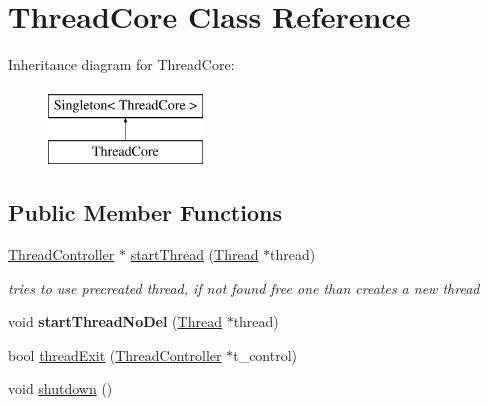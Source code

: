 \hypertarget{classThreadCore}{\section{\-Thread\-Core \-Class \-Reference}
\label{classThreadCore}
}
\-Inheritance diagram for \-Thread\-Core\-:\begin{figure}[H]
\begin{center}
\leavevmode
\includegraphics[height=2.000000cm]{classThreadCore}
\end{center}
\end{figure}
\subsection*{\-Public \-Member \-Functions}
\begin{DoxyCompactItemize}
\item 
\hyperlink{classThreadController}{\-Thread\-Controller} $\ast$ \hyperlink{classThreadCore_acbbb91b15ac93fd819f0902383c212f8}{start\-Thread} (\hyperlink{classThread}{\-Thread} $\ast$thread)
\begin{DoxyCompactList}\small\item\em tries to use precreated thread, if not found free one than creates a new thread \end{DoxyCompactList}\item 
\hypertarget{classThreadCore_a9ca50195858c2eb8b86e5fa00a7aba1a}{void {\bfseries start\-Thread\-No\-Del} (\hyperlink{classThread}{\-Thread} $\ast$thread)}\label{classThreadCore_a9ca50195858c2eb8b86e5fa00a7aba1a}

\item 
bool \hyperlink{classThreadCore_a5dbcca9aafed540a2a07575e0ebe19a2}{thread\-Exit} (\hyperlink{classThreadController}{\-Thread\-Controller} $\ast$t\-\_\-control)
\item 
void \hyperlink{classThreadCore_a2144d2258b27e93b395b6108a52f03e0}{shutdown} ()
\end{DoxyCompactItemize}


